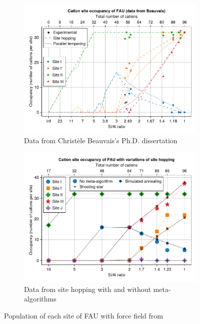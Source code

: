 \documentclass[main.tex]{subfiles}
\begin{document}
\begin{figure}
	\centering
	\begin{subfigure}{0.9\linewidth}
		\centering
		\includegraphics[width=\linewidth]{figures/cations/christele.pdf}
		\caption{Data from Christèle Beauvais's Ph.D. dissertation}\label{fig:christele}
	\end{subfigure}

	\begin{subfigure}{0.9\linewidth}
		\centering
		\includegraphics[width=\linewidth]{figures/cations/FAUJeffroyFF_varationssitehopping.pdf}
		\caption{Data from site hopping with and without meta-algorithms}\label{fig:sitehopping_jeffroyFF}
	\end{subfigure}

	\caption{Population of each site of FAU with force field from \textcite{DiLellaFF}}
\end{figure}
\end{document}
